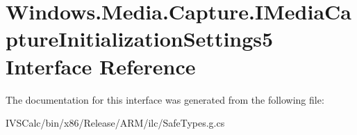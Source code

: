 \hypertarget{interface_windows_1_1_media_1_1_capture_1_1_i_media_capture_initialization_settings5}{}\section{Windows.\+Media.\+Capture.\+I\+Media\+Capture\+Initialization\+Settings5 Interface Reference}
\label{interface_windows_1_1_media_1_1_capture_1_1_i_media_capture_initialization_settings5}


The documentation for this interface was generated from the following file\+:\begin{DoxyCompactItemize}
\item 
I\+V\+S\+Calc/bin/x86/\+Release/\+A\+R\+M/ilc/Safe\+Types.\+g.\+cs\end{DoxyCompactItemize}
